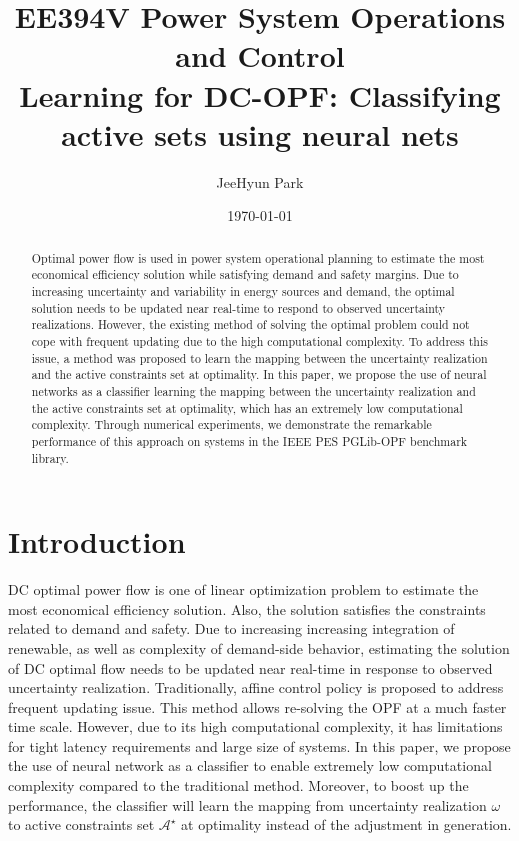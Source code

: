 \documentclass[11pt]{article}
\begin{document}
\title{\bf EE394V Power System Operations and Control\\
Learning for DC-OPF: Classifying active sets using neural nets 
}
\date{\today}
\author{JeeHyun Park}
\maketitle
\begin{abstract}
Optimal power flow is used in power system operational planning to estimate the most economical efficiency solution while satisfying demand and safety margins. Due to increasing uncertainty and variability in energy sources and demand, the optimal solution needs to be updated near real-time to respond to observed uncertainty realizations. However, the existing method of solving the optimal problem could not cope with frequent updating due to the high computational complexity. To address this issue, a method was proposed to learn the mapping between the uncertainty realization and the active constraints set at optimality. In this paper, we propose the use of neural networks as a classifier learning the mapping between the uncertainty realization and the active constraints set at optimality, which has an extremely low computational complexity. Through numerical experiments, we demonstrate the remarkable performance of this approach on systems in the IEEE PES PGLib-OPF benchmark library.
\end{abstract}



\section{Introduction}\label{sec:intro}
DC optimal power flow is one of linear optimization problem to estimate the most economical efficiency solution. Also, the solution satisfies the constraints related to demand and safety. Due to increasing increasing integration of renewable, as well as complexity of demand-side behavior, estimating the solution of DC optimal flow needs to be updated near real-time in response to observed uncertainty realization. Traditionally, affine control policy is proposed to address frequent updating issue. This method allows re-solving the OPF at a much faster time scale. However, due to its high computational complexity, it has limitations for tight latency requirements and large size of systems. In this paper, we propose the use of neural network as a classifier to enable extremely low computational complexity compared to the traditional method. Moreover, to boost up the performance, the classifier will learn the mapping from uncertainty realization $\omega$ to active constraints set $\mathcal{A^{\star}}$ at optimality instead of the adjustment in generation.
\end{document}
